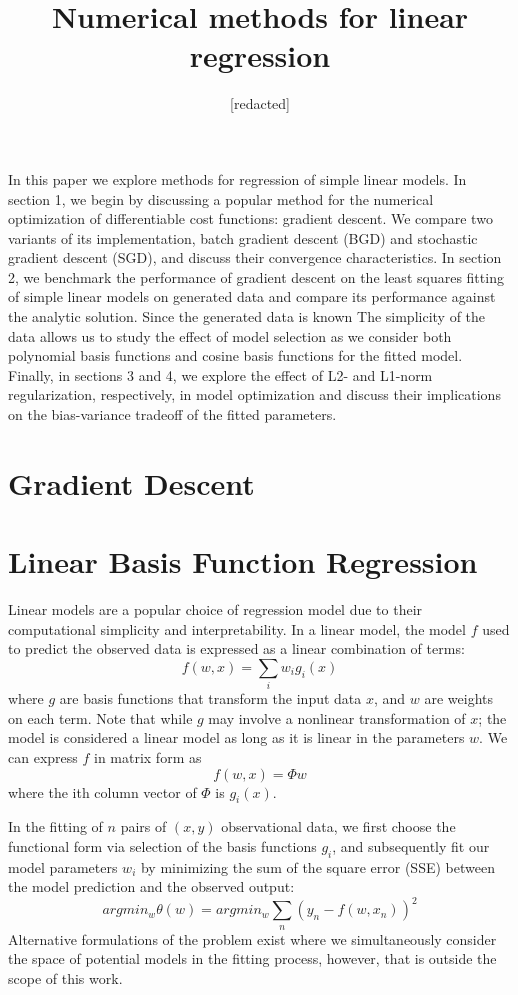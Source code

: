 \documentclass[10pt]{article}
\begin{document}
 
\title{Numerical methods for linear regression}
\author{[redacted]}
\maketitle
 
In this paper we explore methods for regression of simple linear models. In section 1, we begin by discussing a popular method for the numerical optimization of differentiable cost functions: gradient descent. We compare two variants of its implementation, batch gradient descent (BGD) and stochastic gradient descent (SGD), and discuss their convergence characteristics. In section 2, we benchmark the performance of gradient descent on the least squares fitting of simple linear models on generated data and compare its performance against the analytic solution. Since the generated data is known The simplicity of the data allows us to study the effect of model selection as we consider both polynomial basis functions and cosine basis functions for the fitted model. Finally, in sections 3 and 4, we explore the effect of L2- and L1-norm regularization, respectively, in model optimization and discuss their implications on the bias-variance tradeoff of the fitted parameters.

\section{Gradient Descent}

\section{Linear Basis Function Regression}

Linear models are a popular choice of regression model due to their computational simplicity and interpretability. In a linear model, the model $f$ used to predict the observed data is expressed as a linear combination of terms:
$$ f(w,x) = \sum_i w_ig_i(x) $$
where $g$ are basis functions that transform the input data $x$, and $w$ are weights on each term. Note that while $g$ may involve a nonlinear transformation of $x$; the model is considered a linear model as long as it is linear in the parameters $w$. We can express $f$ in matrix form as
$$f(w,x) = \Phi w$$
where the ith column vector of $\Phi$ is $g_i(x)$. 

In the fitting of $n$ pairs of $(x,y)$ observational data, we first choose the functional form via selection of the basis functions $g_i$, and subsequently fit our model parameters $w_i$ by minimizing the sum of the square error (SSE) between the model prediction and the observed output: 
$$ argmin_w \theta(w) = argmin_w \sum_n (y_n - f(w,x_n))^2$$ %
Alternative formulations of the problem exist where we simultaneously consider the space of potential models in the fitting process, however, that is outside the scope of this work.
\end{document}
